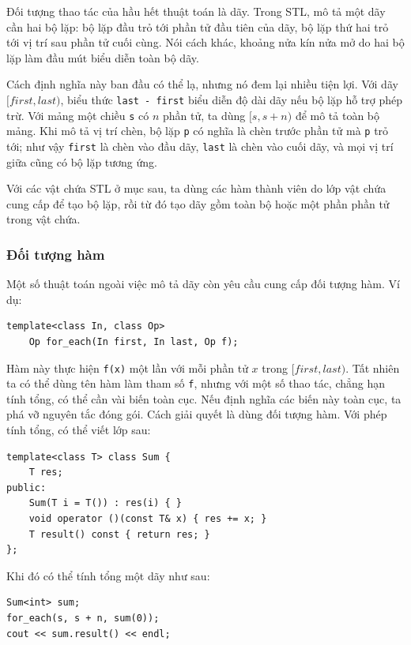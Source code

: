 \documentclass[11pt]{article}
\begin{document}
Đối tượng thao tác của hầu hết thuật toán là dãy. Trong STL, mô tả một dãy
cần hai bộ lặp: bộ lặp đầu trỏ tới phần tử đầu tiên của dãy, bộ lặp thứ hai
trỏ tới vị trí sau phần tử cuối cùng. Nói cách khác, khoảng nửa kín nửa mở do
hai bộ lặp làm đầu mút biểu diễn toàn bộ dãy.

Cách định nghĩa này ban đầu có thể lạ, nhưng nó đem lại nhiều tiện lợi. Với
dãy \([first,last)\), biểu thức \verb|last - first| biểu diễn độ dài dãy nếu
bộ lặp hỗ trợ phép trừ. Với mảng một chiều \verb|s| có \(n\) phần tử, ta dùng
\([s,s+n)\) để mô tả toàn bộ mảng. Khi mô tả vị trí chèn, bộ lặp \verb|p| có
nghĩa là chèn trước phần tử mà \verb|p| trỏ tới; như vậy \verb|first| là chèn
vào đầu dãy, \verb|last| là chèn vào cuối dãy, và mọi vị trí giữa cũng có bộ
lặp tương ứng.

Với các vật chứa STL ở mục sau, ta dùng các hàm thành viên do lớp vật chứa
cung cấp để tạo bộ lặp, rồi từ đó tạo dãy gồm toàn bộ hoặc một phần phần tử
trong vật chứa.

\subsubsection*{Đối tượng hàm}

Một số thuật toán ngoài việc mô tả dãy còn yêu cầu cung cấp đối tượng hàm.
Ví dụ:

\begin{verbatim}
template<class In, class Op>
    Op for_each(In first, In last, Op f);
\end{verbatim}

Hàm này thực hiện \verb|f(x)| một lần với mỗi phần tử \(x\) trong
\([first,last)\). Tất nhiên ta có thể dùng tên hàm làm tham số \verb|f|, nhưng
với một số thao tác, chẳng hạn tính tổng, có thể cần vài biến toàn cục. Nếu
định nghĩa các biến này toàn cục, ta phá vỡ nguyên tắc đóng gói. Cách giải
quyết là dùng đối tượng hàm. Với phép tính tổng, có thể viết lớp sau:

\begin{verbatim}
template<class T> class Sum {
    T res;
public:
    Sum(T i = T()) : res(i) { }
    void operator ()(const T& x) { res += x; }
    T result() const { return res; }
};
\end{verbatim}

Khi đó có thể tính tổng một dãy như sau:

\begin{verbatim}
Sum<int> sum;
for_each(s, s + n, sum(0));
cout << sum.result() << endl;
\end{verbatim}
\end{document}
